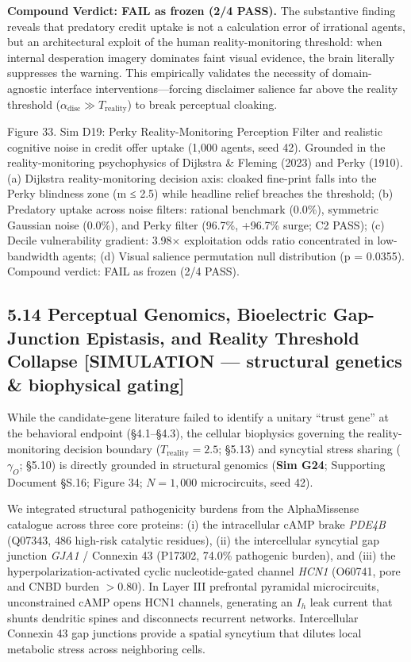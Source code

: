 \documentclass[
]{article}
\begin{document}
\textbf{Compound Verdict: FAIL as frozen (2/4 PASS).} The substantive
finding reveals that predatory credit uptake is not a calculation error
of irrational agents, but an architectural exploit of the human
reality-monitoring threshold: when internal desperation imagery
dominates faint visual evidence, the brain literally suppresses the
warning. This empirically validates the necessity of domain-agnostic
interface interventions---forcing disclaimer salience far above the
reality threshold (\(\alpha_{\text{disc}} \gg T_{\text{reality}}\)) to
break perceptual cloaking.

Figure 33. Sim D19: Perky Reality-Monitoring Perception Filter and
realistic cognitive noise in credit offer uptake (1,000 agents, seed
42). Grounded in the reality-monitoring psychophysics of Dijkstra \&
Fleming (2023) and Perky (1910). (a) Dijkstra reality-monitoring
decision axis: cloaked fine-print falls into the Perky blindness zone
({m ≤ 2.5}) while headline relief breaches the threshold; (b) Predatory
uptake across noise filters: rational benchmark (0.0\%), symmetric
Gaussian noise (0.0\%), and Perky filter (96.7\%, +96.7\% surge; C2
PASS); (c) Decile vulnerability gradient: {3.98×} exploitation odds
ratio concentrated in low-bandwidth agents; (d) Visual salience
permutation null distribution ({p = 0.0355}). Compound verdict: FAIL as
frozen (2/4 PASS).

\subsection{5.14 Perceptual Genomics, Bioelectric Gap-Junction
Epistasis, and Reality Threshold Collapse {[}SIMULATION --- structural
genetics \& biophysical
gating{]}}\label{perceptual-genomics-bioelectric-gap-junction-epistasis-and-reality-threshold-collapse-simulation-structural-genetics-biophysical-gating}

While the candidate-gene literature failed to identify a unitary ``trust
gene'' at the behavioral endpoint (§4.1--§4.3), the cellular biophysics
governing the reality-monitoring decision boundary
(\(T_{\text{reality}} = 2.5\); §5.13) and syncytial stress sharing
(\(\gamma_O\); §5.10) is directly grounded in structural genomics
(\textbf{Sim G24}; Supporting Document §S.16; Figure 34; \(N = 1,000\)
microcircuits, seed 42).

We integrated structural pathogenicity burdens from the AlphaMissense
catalogue across three core proteins: (i) the intracellular cAMP brake
\emph{PDE4B} (Q07343, 486 high-risk catalytic residues), (ii) the
intercellular syncytial gap junction \emph{GJA1} / Connexin 43 (P17302,
74.0\% pathogenic burden), and (iii) the hyperpolarization-activated
cyclic nucleotide-gated channel \emph{HCN1} (O60741, pore and CNBD
burden \(>0.80\)). In Layer III prefrontal pyramidal microcircuits,
unconstrained cAMP opens HCN1 channels, generating an \(I_h\) leak
current that shunts dendritic spines and disconnects recurrent networks.
Intercellular Connexin 43 gap junctions provide a spatial syncytium that
dilutes local metabolic stress across neighboring cells.
\end{document}
